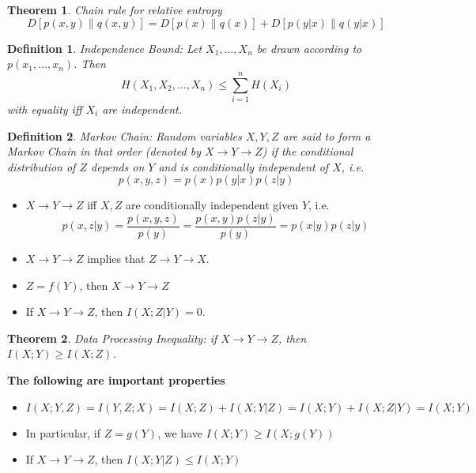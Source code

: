 \documentclass[10pt,landscape, a4paper]{article}
\newtheorem{definition}{Definition}
\newtheorem{theorem}{Theorem}
\begin{document}
\begin{multicols}{3}
\begin{theorem}
    Chain rule for relative entropy
$$
D[p(x,y)\parallel q(x,y)]=D[p(x)\parallel q(x)]+D[p(y|x)\parallel q(y|x)]
$$
\end{theorem}

\begin{definition}
    Independence Bound: Let $X_1, \dots, X_n$ be drawn according to $p(x_1,\dots,x_n)$. Then
    $$
    H(X_1, X_2,\dots, X_n)\le \sum_{i=1}^n H(X_i)
    $$
    with equality iff $X_i$ are independent.
\end{definition}

\begin{definition}
    Markov Chain: Random variables $X,Y,Z$ are said to form a Markov Chain in that order (denoted by $X\rightarrow Y\rightarrow Z$) if the conditional distribution of $Z$ depends on $Y$ and is conditionally independent of $X$, i.e.
    $$
    p(x,y,z)=p(x)p(y|x)p(z|y)
    $$
\end{definition}

\begin{itemize}
    \item $X\rightarrow Y\rightarrow Z$ iff $X,Z$ are conditionally independent given $Y$, i.e.
    $$
    p(x,z|y)=\frac{p(x,y,z)}{p(y)}=\frac{p(x,y)p(z|y)}{p(y)}=p(x|y)p(z|y)
    $$
  
    \item $X\rightarrow Y\rightarrow Z$ implies that $Z\rightarrow Y\rightarrow X$.
  
    \item $Z=f(Y)$, then $X\rightarrow Y\rightarrow Z$
  
    \item If $X\rightarrow Y\rightarrow Z$, then $I(X;Z|Y)=0$.
\end{itemize}

\begin{theorem}
    Data Processing Inequality: if $X\rightarrow Y\rightarrow Z$, then $I(X;Y)\ge I(X;Z)$.
\end{theorem}

\textbf{The following are important properties}
\begin{itemize}
    \item $I(X;Y,Z)=I(Y,Z;X)=I(X;Z)+I(X;Y|Z)=I(X;Y)+I(X;Z|Y)=I(X;Y)$
    \item In particular, if $Z=g(Y)$, we have $I(X;Y)\ge I(X;g(Y))$
    \item If $X\rightarrow Y\rightarrow Z$, then $I(X;Y|Z)\le I(X;Y)$
\end{itemize}


\end{multicols}
\end{document}
